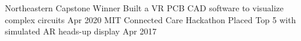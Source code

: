 
\begin{cvhonors}

  \cvhonor
    {Northeastern Capstone Winner} %
    {Built a VR PCB CAD software to visualize complex circuits} %
    {Apr 2020} %
  \cvhonor
    {MIT Connected Care Hackathon} %
    {Placed Top 5 with simulated AR heads-up display} %
    {Apr 2017} %
    
%
\end{cvhonors}